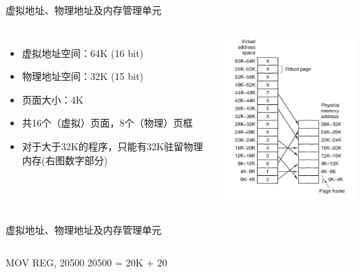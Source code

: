 \documentclass[xcolor=svgnames]{beamer}
\begin{document}
\begin{CJK*}{UTF8}{gbsn}
\begin{frame}{虚拟地址、物理地址及内存管理单元}
\begin{columns}%
\begin{itemize}
\item 虚拟地址空间：64K (16 bit)
\item 物理地址空间：32K (15 bit)
\item 页面大小：4K 
\item 共16个（虚拟）页面，8个（物理）页框
\item 对于大于32K的程序，只能有32K驻留物理内存(右图数字部分)
\end{itemize}
\includegraphics[width=1.0\textwidth]{vm.png}
\end{columns}%
\end{frame}

\begin{frame}{虚拟地址、物理地址及内存管理单元}
\begin{columns}%
\begin{block}{MOV REG, 20500}
20500 = 20K + 20 


\end{block}
\end{columns}
\end{frame}
\end{CJK*}
\end{document}
